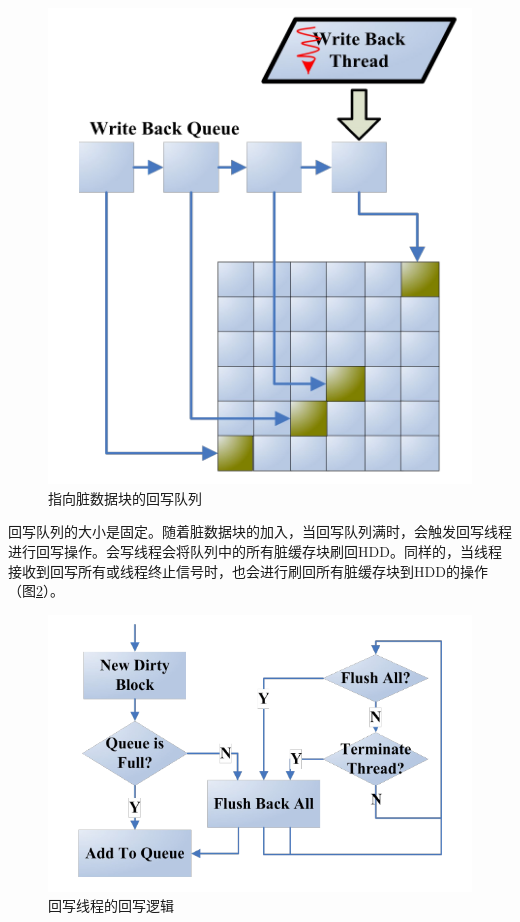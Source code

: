 \begin{figure}[H]
\centering
\includegraphics[width=0.4\linewidth]{./graph/write-back-queue}
\caption{指向脏数据块的回写队列}
\label{fig:write-back-queue}
\end{figure}

回写队列的大小是固定。随着脏数据块的加入，当回写队列满时，会触发回写线程进行回写操作。会写线程会将队列中的所有脏缓存块刷回HDD。同样的，当线程接收到回写所有或线程终止信号时，也会进行刷回所有脏缓存块到HDD的操作（图\ref{fig:write-back-thread}）。

\begin{figure}[H]
\centering
\includegraphics[width=0.6\linewidth]{./graph/write-back-thread}
\caption{回写线程的回写逻辑}
\label{fig:write-back-thread}
\end{figure}

